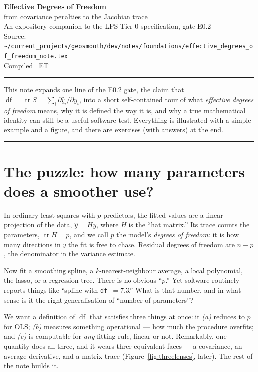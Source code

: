 \documentclass[11pt]{article}
\DeclareMathOperator{\tr}{tr}
\DeclareMathOperator{\df}{df}
\newcommand{\yhat}{\hat y}
\theoremstyle{definition}
\theoremstyle{plain}
\begin{document}
\begin{center}
{\LARGE\bfseries Effective Degrees of Freedom}\\[3pt]
{\large from covariance penalties to the Jacobian trace}\\[10pt]
{\small An expository companion to the LPS Tier-0 specification, gate E0.2}\\[8pt]
{\footnotesize Source: \nolinkurl{~/current_projects/geosmooth/dev/notes/foundations/effective_degrees_of_freedom_note.tex}}\\[2pt]
{\footnotesize Compiled \DTMnow\ ET}
\end{center}

\vspace{0.5em}
\hrule
\vspace{1em}

This note expands one line of the E0.2 gate, the claim that
$\df = \tr S = \sum_i \partial \yhat_i/\partial y_i$, into a short self-contained
tour of what \emph{effective degrees of freedom} means, why it is defined the way
it is, and why a true mathematical identity can still be a useful software test.
Everything is illustrated with a simple example and a figure, and there are
exercises (with answers) at the end.

\tableofcontents
\vspace{1em}
\hrule
\vspace{1em}

\section{The puzzle: how many parameters does a smoother use?}

In ordinary least squares with $p$ predictors, the fitted values are a linear
projection of the data, $\yhat = Hy$, where $H$ is the ``hat matrix.'' Its trace
counts the parameters, $\tr H = p$, and we call $p$ the model's
\emph{degrees of freedom}: it is how many directions in $y$ the fit is free to
chase. Residual degrees of freedom are $n-p$, the denominator in the variance
estimate.

Now fit a smoothing spline, a $k$-nearest-neighbour average, a local polynomial,
the lasso, or a regression tree. There is no obvious ``$p$.'' Yet software
routinely reports things like ``spline with \texttt{df}~$=7.3$.'' What is that
number, and in what sense is it the right generalisation of ``number of
parameters''?

We want a definition of $\df$ that satisfies three things at once: it
\emph{(a)} reduces to $p$ for OLS; \emph{(b)} measures something operational ---
how much the procedure overfits; and \emph{(c)} is computable for \emph{any}
fitting rule, linear or not. Remarkably, one quantity does all three, and it
wears three equivalent faces --- a covariance, an average derivative, and a
matrix trace (Figure~\ref{fig:threelenses}, later). The rest of the note builds
it.
\end{document}
